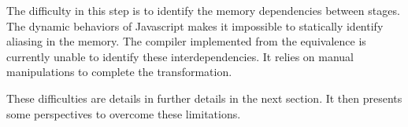The difficulty in this step is to identify the memory dependencies between stages.
The dynamic behaviors of Javascript makes it impossible to statically identify aliasing in the memory.
The compiler implemented from the equivalence is currently unable to identify these interdependencies.
It relies on manual manipulations to complete the transformation.

\separator

These difficulties are details in further details in the next section.
It then presents some perspectives to overcome these limitations.